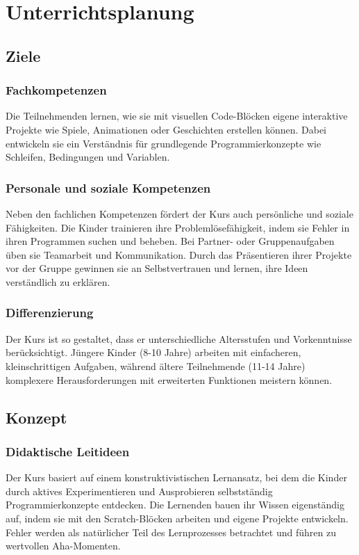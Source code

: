 \chapter{Unterrichtsplanung}
\label{Unterrichtsplanung}
\section{Ziele}
\label{sec:Ziele}
\subsection{Fachkompetenzen}
\label{Fachkompetenzen}
Die Teilnehmenden lernen, wie sie mit visuellen Code-Blöcken eigene interaktive Projekte wie Spiele, Animationen oder Geschichten erstellen können. Dabei entwickeln sie ein Verständnis für grundlegende Programmierkonzepte wie Schleifen, Bedingungen und Variablen.
\subsection{Personale und soziale Kompetenzen}
\label{sec:Personale und soziale Kompetenzen}
Neben den fachlichen Kompetenzen fördert der Kurs auch persönliche und soziale Fähigkeiten. Die Kinder trainieren ihre Problemlösefähigkeit, indem sie Fehler in ihren Programmen suchen und beheben. Bei Partner- oder Gruppenaufgaben üben sie Teamarbeit und Kommunikation. Durch das Präsentieren ihrer Projekte vor der Gruppe gewinnen sie an Selbstvertrauen und lernen, ihre Ideen verständlich zu erklären.
\subsection{Differenzierung}
\label{Differenzierung}
Der Kurs ist so gestaltet, dass er unterschiedliche Altersstufen und Vorkenntnisse berücksichtigt. Jüngere Kinder (8-10 Jahre) arbeiten mit einfacheren, kleinschrittigen Aufgaben, während ältere Teilnehmende (11-14 Jahre) komplexere Herausforderungen mit erweiterten Funktionen meistern können.
\section{Konzept}
\label{sec:Konzept}
\subsection{Didaktische Leitideen}
\label{sec:Didaktische Leitideen}
Der Kurs basiert auf einem konstruktivistischen Lernansatz, bei dem die Kinder durch aktives Experimentieren und Ausprobieren selbstständig Programmierkonzepte entdecken. Die Lernenden bauen ihr Wissen eigenständig auf, indem sie mit den Scratch-Blöcken arbeiten und eigene Projekte entwickeln. Fehler werden als natürlicher Teil des Lernprozesses betrachtet und führen zu wertvollen Aha-Momenten.

